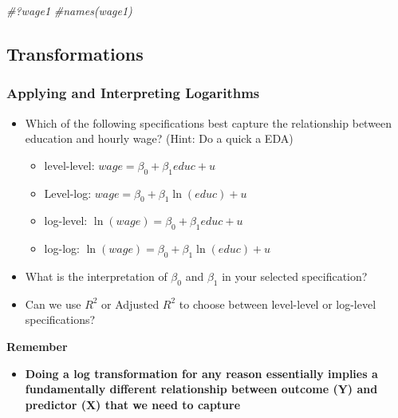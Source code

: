 \documentclass[
]{book}
\newenvironment{Shaded}{\begin{snugshade}}{\end{snugshade}}
\newcommand{\CommentTok}[1]{\textcolor[rgb]{0.56,0.35,0.01}{\textit{#1}}}
\providecommand{\tightlist}{%
  \setlength{\itemsep}{0pt}\setlength{\parskip}{0pt}}
\theoremstyle{definition}
\theoremstyle{definition}
\theoremstyle{definition}
\theoremstyle{definition}
\theoremstyle{remark}
\begin{document}
\begin{Shaded}
\begin{Highlighting}[]
\CommentTok{\#?wage1}
\CommentTok{\#names(wage1)}
\end{Highlighting}
\end{Shaded}

\hypertarget{transformations}{%
\subsection{Transformations}\label{transformations}}

\hypertarget{applying-and-interpreting-logarithms}{%
\subsubsection{Applying and Interpreting Logarithms}\label{applying-and-interpreting-logarithms}}

\begin{itemize}
\item
  Which of the following specifications best capture the relationship between education and hourly wage? (Hint: Do a quick a EDA)

  \begin{itemize}
  \tightlist
  \item
    level-level: \(wage = \beta_0 + \beta_1 educ + u\)
  \item
    Level-log: \(wage = \beta_0 + \beta_1 \ln(educ) + u\)
  \item
    log-level: \(\ln(wage) = \beta_0 + \beta_1 educ + u\)
  \item
    log-log: \(\ln(wage) = \beta_0 + \beta_1 \ln(educ) + u\)
  \end{itemize}
\item
  What is the interpretation of \(\beta_0\) and \(\beta_1\) in your selected specification?
\item
  Can we use \(R^2\) or Adjusted \(R^2\) to choose between level-level or log-level specifications?
\end{itemize}

\textbf{Remember}

\begin{itemize}
\tightlist
\item
  \textbf{Doing a log transformation for any reason essentially implies a fundamentally different relationship between outcome (Y) and predictor (X) that we need to capture}
\end{itemize}
\end{document}
